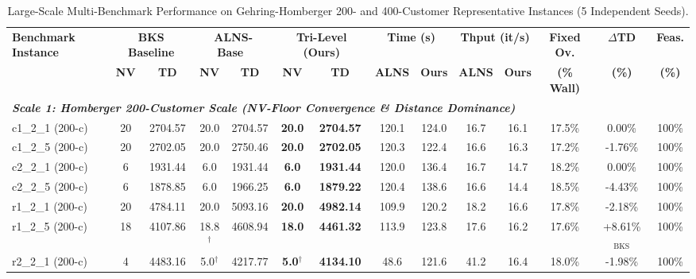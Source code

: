 \documentclass{ieeeaccess}
\begin{document}
\begin{table}[!t]
\caption{Large-Scale Multi-Benchmark Performance on Gehring-Homberger 200- and 400-Customer Representative Instances (5 Independent Seeds).}
\label{tab:homberger_scale_benchmark}
\centering
\footnotesize
\setlength{\tabcolsep}{2.0pt}
\begin{tabular*}{\textwidth}{@{\extracolsep{\fill}} l cc cc cc cc cc c c c @{}}
\toprule
\multirow{2}{*}{\textbf{Benchmark Instance}} & \multicolumn{2}{c}{\textbf{BKS Baseline}} & \multicolumn{2}{c}{\textbf{ALNS-Base~\cite{Ropke2006}}} & \multicolumn{2}{c}{\textbf{Tri-Level (Ours)}} & \multicolumn{2}{c}{\textbf{Time (s)}} & \multicolumn{2}{c}{\textbf{Thput (it/s)}} & \textbf{Fixed Ov.} & $\Delta$\textbf{TD} & \textbf{Feas.} \\
\cmidrule(lr){2-3} \cmidrule(lr){4-5} \cmidrule(lr){6-7} \cmidrule(lr){8-9} \cmidrule(lr){10-11} \cmidrule(lr){12-12} \cmidrule(lr){13-13} \cmidrule(lr){14-14}
 & \textbf{NV} & \textbf{TD} & \textbf{NV} & \textbf{TD} & \textbf{NV} & \textbf{TD} & \textbf{ALNS} & \textbf{Ours} & \textbf{ALNS} & \textbf{Ours} & \textbf{(\% Wall)} & \textbf{(\%)} & \textbf{(\%)} \\
\midrule
\multicolumn{14}{l}{\textit{\textbf{Scale 1: Homberger 200-Customer Scale (NV-Floor Convergence \& Distance Dominance)}}} \\
c1\_2\_1 (200-c) & 20 & 2704.57 & 20.0 & 2704.57 & \textbf{20.0} & \textbf{2704.57} & 120.1 & 124.0 & 16.7 & 16.1 & 17.5\% & 0.00\% & 100\% \\
c1\_2\_5 (200-c) & 20 & 2702.05 & 20.0 & 2750.46 & \textbf{20.0} & \textbf{2702.05} & 120.3 & 122.4 & 16.6 & 16.3 & 17.2\% & -1.76\% & 100\% \\
c2\_2\_1 (200-c) & 6 & 1931.44 & 6.0 & 1931.44 & \textbf{6.0} & \textbf{1931.44} & 120.0 & 136.4 & 16.7 & 14.7 & 18.2\% & 0.00\% & 100\% \\
c2\_2\_5 (200-c) & 6 & 1878.85 & 6.0 & 1966.25 & \textbf{6.0} & \textbf{1879.22} & 120.4 & 138.6 & 16.6 & 14.4 & 18.5\% & -4.43\% & 100\% \\
r1\_2\_1 (200-c) & 20 & 4784.11 & 20.0 & 5093.16 & \textbf{20.0} & \textbf{4982.14} & 109.9 & 120.2 & 18.2 & 16.6 & 17.8\% & -2.18\% & 100\% \\
r1\_2\_5 (200-c) & 18 & 4107.86 & 18.8$^\dagger$ & 4608.94 & \textbf{18.0} & \textbf{4461.32} & 113.9 & 123.8 & 17.6 & 16.2 & 17.6\% & +8.61\%$_{\text{BKS}}$ & 100\% \\
r2\_2\_1 (200-c) & 4 & 4483.16 & 5.0$^\dagger$ & 4217.77 & \textbf{5.0}$^\dagger$ & \textbf{4134.10} & 48.6 & 121.6 & 41.2 & 16.4 & 18.0\% & -1.98\% & 100\% \\

\end{tabular*}
\end{table}
\end{document}
